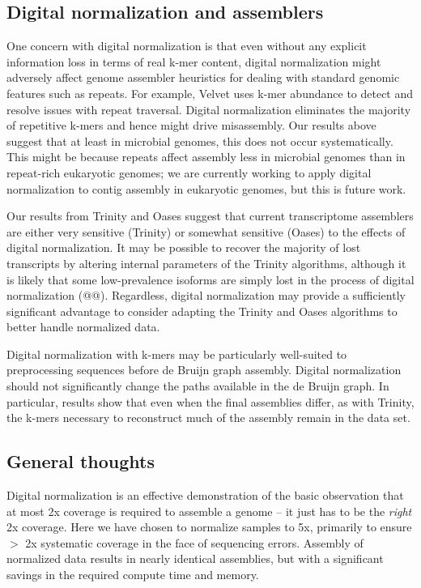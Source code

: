 \documentclass[10pt,draft]{article}
\begin{document}
\subsection{Digital normalization and assemblers}

One concern with digital normalization is that even without any
explicit information loss in terms of real k-mer content, digital
normalization might adversely affect genome assembler heuristics for
dealing with standard genomic features such as repeats.  For example,
Velvet uses k-mer abundance to detect and resolve issues with repeat
traversal.  Digital normalization eliminates the majority of
repetitive k-mers and hence might drive misassembly. Our results above
suggest that at least in microbial genomes, this does not occur
systematically.  This might be because repeats affect assembly less in
microbial genomes than in repeat-rich eukaryotic genomes; we are
currently working to apply digital normalization to contig assembly in
eukaryotic genomes, but this is future work.

Our results from Trinity and Oases suggest that current transcriptome
assemblers are either very sensitive (Trinity) or somewhat sensitive
(Oases) to the effects of digital normalization.  It may be possible
to recover the majority of lost transcripts by altering internal
parameters of the Trinity algorithms, although it is likely that some
low-prevalence isoforms are simply lost in the process of digital
normalization (@@).  Regardless, digital normalization may provide
a sufficiently significant advantage to consider adapting the Trinity
and Oases algorithms to better handle normalized data.

Digital normalization with k-mers may be particularly well-suited to
preprocessing sequences before de Bruijn graph assembly.  Digital
normalization should not significantly change the paths available in
the de Bruijn graph.  In particular, results show that even when the
final assemblies differ, as with Trinity, the k-mers necessary to
reconstruct much of the assembly remain in the data set.

\subsection{General thoughts}

Digital normalization is an effective demonstration of the basic
observation that at most 2x coverage is required to assemble a genome
-- it just has to be the {\em right} 2x coverage.  Here we have chosen
to normalize samples to 5x, primarily to ensure $>$ 2x systematic
coverage in the face of sequencing errors.  Assembly of normalized
data results in nearly identical assemblies, but with a significant
savings in the required compute time and memory.
\end{document}

